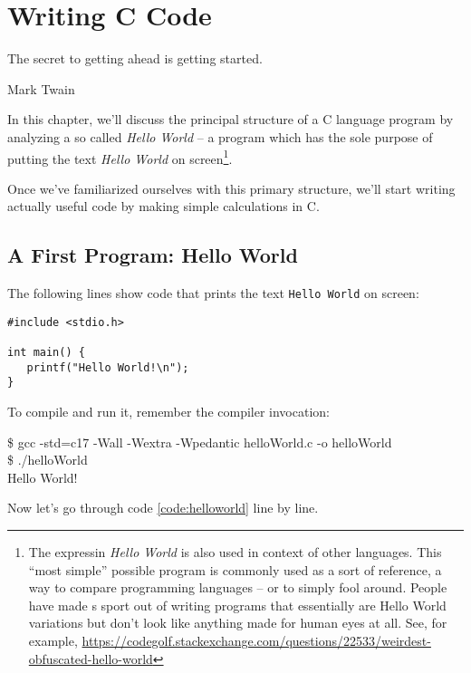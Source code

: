 \chapter{Writing C Code}
\epigraph{The secret to getting ahead is getting started.}{Mark Twain}

In this chapter, we'll discuss the principal structure of a C language program by analyzing a so called \emph{Hello World} -- a program which has the sole purpose of putting the text \emph{Hello World} on screen\footnote{The expressin \emph{Hello World} is also used in context of other languages. This \enquote{most simple} possible program is commonly used as a sort of reference, a way to compare programming languages -- or to simply fool around. People have made s sport out of writing programs that essentially are Hello World variations but don't look like anything made for human eyes at all. See, for example, \url{https://codegolf.stackexchange.com/questions/22533/weirdest-obfuscated-hello-world}}.

Once we've familiarized ourselves with this primary structure, we'll start writing actually useful code by making simple calculations in C.

\section{A First Program: Hello World}

The following lines show code that prints the text \texttt{Hello World} on screen:
\begin{codebox}[helloworld.c]
\begin{verbatim}
#include <stdio.h>

int main() {
   printf("Hello World!\n");
}
\end{verbatim}
 \label{code:helloworld}
\end{codebox}

To compile and run it, remember the compiler invocation:

\begin{cmdbox}
\$ gcc -std=c17 -Wall -Wextra -Wpedantic helloWorld.c -o helloWorld \\
\$ ./helloWorld \\
Hello World!
\end{cmdbox}

Now let's go through code \ref{code:helloworld} line by line.

